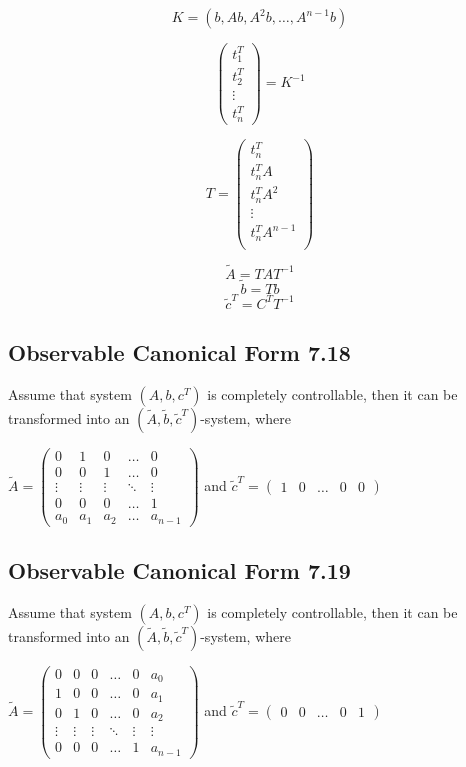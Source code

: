 \documentclass[12pt]{article}
\begin{document}
$$K=(b,Ab,A^2b,\dots,A^{n-1}b)$$

$$\begin{pmatrix}
	t_1^T\\
	t_2^T\\
	\vdots\\
	t_n^T
\end{pmatrix} = K^{-1}$$

$$T=\begin{pmatrix}
	t_n^T\\
	t_n^TA\\
	t_n^TA^2\\
	\vdots\\
	t_n^TA^{n-1}\\
\end{pmatrix}$$

$$\tilde{A}=TAT^{-1}$$
$$\tilde{b}=Tb$$
$$\tilde{c}^T=C^TT^{-1}$$

\subsection*{Observable Canonical Form 7.18}
Assume that system $(A, b, c^T)$ is completely controllable, then it can be transformed into an $(\tilde{A}, \tilde{b}, \tilde{c}^T)$-system, where \\
\begin{center}
$\tilde{A}=
\begin{pmatrix}
	0 & 1 & 0 & \dots & 0 \\
	0 & 0 & 1 & \dots & 0 \\
	\vdots & \vdots & \vdots & \ddots & \vdots \\
	0 & 0 & 0 & \dots & 1 \\
	a_0 & a_1 & a_2 & \dots & a_{n-1} 
\end{pmatrix}$ and 
$\tilde{c}^T=\begin{pmatrix}
1 & 0 & \dots & 0 & 0
\end{pmatrix}$
\end{center}

\subsection*{Observable Canonical Form 7.19}
Assume that system $(A, b, c^T)$ is completely controllable, then it can be transformed into an $(\tilde{A}, \tilde{b}, \tilde{c}^T)$-system, where \\
\begin{center}
$\tilde{A}=
\begin{pmatrix}
	0 & 0 & 0 & \dots & 0 & a_0 \\
	1 & 0 & 0 & \dots & 0 & a_1 \\
	0 & 1 & 0 & \dots & 0 & a_2 \\
	\vdots & \vdots & \vdots & \ddots & \vdots & \vdots \\
	0 & 0 & 0 & \dots & 1 & a_{n-1} 
\end{pmatrix}$ and 
$\tilde{c}^T=\begin{pmatrix}
0 & 0 & \dots & 0 & 1
\end{pmatrix}$
\end{center}
\end{document}
